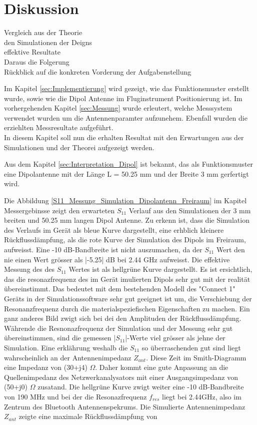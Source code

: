 \chapter{Diskussion}
Vergleich aus der Theorie\\
den Simulationen der Deigns\\
effektive Resultate\\

Daraus die Folgerung\\

Rückblick auf die konkreten Vorderung der Aufgabenstellung

Im Kapitel \ref{sec:Implementierung} wird gezeigt, wie das Funktionsmuster erstellt wurde, sowie wie die Dipol Antenne  im Fluginstrument Positionierung ist. Im vorhergehenden Kapitel \ref{sec:Messung} wurde erleutert, welche Messsystem verwendet wurden um die Antennenparamter aufzunehem. Ebenfall wurden die erziehlten Messresultate aufgeführt.\\
In diesem Kapitel soll nun die erhalten Resultat mit den Erwartungen aus der Simulationen und der Theorei aufgezeigt werden.

Aus dem Kapitel \ref{sec:Interpretation_Dipol} ist bekannt, das als Funktionsmuster eine Dipolantenne mit der Länge L = 50.25 mm und der Breite 3 mm gerfertigt wird. 

Die Abbildung \ref{S11_Messung_Simulation_Dipolantenn_Freiraum} im Kapitel Messergebinsse zeigt den erwarteten $S_{11}$ Verlauf aus den Simulationen der 3 mm breiten und 50.25 mm langen Dipol Antenne.  Zu erkenn ist, dass die Simulation des Verlaufs im Gerät als bleue Kurve dargestellt, eine erhblich kleinere Rückflussdämpfung, als die rote Kurve der Simulation des Dipols im Freiraum, aufweisst. Eine -10 dB-Bandbreite ist nicht auszumachen, da der $S_{11}$ Wert den nie einen Wert grösser als |-5.25| dB bei 2.44 GHz aufweisst. Die effektive Messung des des $S_{11}$ Wertes ist als hellgrüne Kurve dargestellt. Es ist ersichtlich, das die resonazfrequenz des im Gerät imulierten Dipols sehr gut mit der realität übereinstimmt. Das bedeutet mit dem bestehenden Modell des "Connect 1" Geräts in der Simulationssoftware sehr gut geeignet ist um, die Verschiebung der Resonanzfrequenz durch die materialspeziefischen Eigenschaften zu machen. Ein ganz anderes Bild zwigt sich bei dei den Amplituden der Rückflussdämpfung. Währende die Resnonazfrequenz der Simulation und der Messung sehr gut übereinstimmen, sind die gemessen |$S_{11}$|-Werte viel grösser als jehne der Simulation. Eine erklährung weshalb die $S_{11}$ so überraschenden gut sind liegt wahrscheinlich an der Antennenimpedanz $Z_{ant}$. Diese Zeit im Smith-Diagramm eine Impedanz von (30+j4) $\Omega$. Daher kommt eine gute Anpassung an die Quellenimpedanz des Netzwerkanalysators mit einer Ausgangsimpedanz von (50+j0) $\Omega$ zusatand. Die hellgrüne Kurve zwigt weiter eine -10 dB-Bandbreite von 190 MHz und bei der die Resonazfrequenz $f_{res}$ liegt bei 2.44GHz, also im Zentrum des Bluetooth Antennenspekrums. Die Simulierte Antennenimpedanz $Z_{ant}$ zeigte eine maximale Rückflussdämpfung von   


